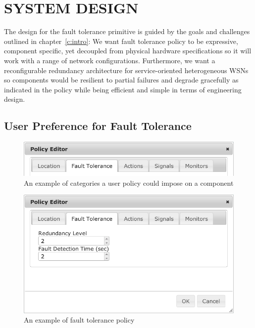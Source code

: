 \cleardoublepage
\singlespacing
\chapter{SYSTEM DESIGN}
\label{c:design}
\doublespacing\nointerlineskip

The design for the fault tolerance primitive is guided by the goals and
challenges outlined in chapter~\ref{c:intro}: We want fault tolerance
policy to be expressive, component specific, yet decoupled from physical
hardware specifications so it will work with a range of network configurations.
Furthermore, we want a reconfigurable redundancy architecture for
service-oriented heterogeneous WSNs so components would be resilient to partial
failures and degrade gracefully as indicated in the policy while being efficient
and simple in terms of engineering design.

\section{User Preference for Fault Tolerance}

\begin{figure}[h!]
\centering
    \includegraphics[width=\linewidth]{figures/fbp-policy}
\caption{An example of categories a user policy could impose on a component}
\label{fig:fbp-policy}
\end{figure}

\begin{figure}[h!]
\centering
    \includegraphics[width=\linewidth]{figures/fbp-ft-policy}
\caption{An example of fault tolerance policy}
\label{fig:fbp-ft-policy}
\end{figure}

